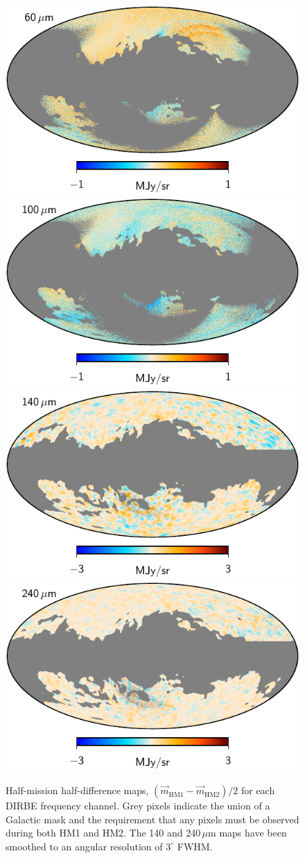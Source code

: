 \documentclass{aa}
\newcommand{\m}[0]{\vec{m}}
\begin{document}
\begin{figure}
  \includegraphics[width=0.42\linewidth]{figs/dirbe_07_hmhd_v1.pdf}\hspace*{5mm}
  \includegraphics[width=0.42\linewidth]{figs/dirbe_08_hmhd_v1.pdf}\\
  \includegraphics[width=0.42\linewidth]{figs/dirbe_09_hmhd_v1_3deg.pdf}\hspace*{5mm}
  \includegraphics[width=0.42\linewidth]{figs/dirbe_10_hmhd_v1_3deg.pdf}
  \caption{Half-mission half-difference maps, $(\m_{\mathrm{HM1}}-\m_{\mathrm{HM2}})/2$ for each DIRBE frequency channel. Grey pixels indicate the union of a Galactic mask and the requirement that any pixels must be observed during both HM1 and HM2. The 140 and 240\,$\mu\mathrm{m}$ maps have been smoothed to an angular resolution of $3^{\circ}$ FWHM.}
  \label{fig:hmhd}
\end{figure}
\end{document}
